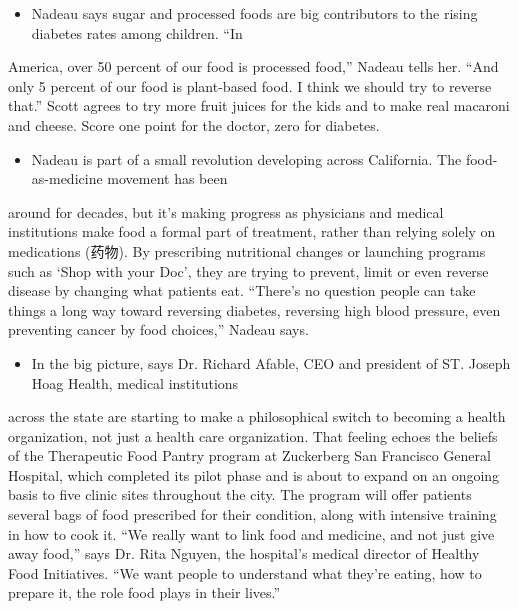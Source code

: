 \documentclass[UTF8,11pt]{ctexart}
\begin{document}
\begin{itemize}[leftmargin=2em,itemsep=.2em,topsep=.4em]\item[D.] Nadeau says sugar and processed foods are big contributors to the rising diabetes rates among children. “In
\end{itemize}

America, over 50 percent of our food is processed food,” Nadeau tells her. “And only 5 percent of our food is plant-based food. I think we should try to reverse that.” Scott agrees to try more fruit juices for the kids and to make real macaroni and cheese. Score one point for the doctor, zero for diabetes.


\begin{itemize}[leftmargin=2em,itemsep=.2em,topsep=.4em]\item[E.] Nadeau is part of a small revolution developing across California. The food-as-medicine movement has been
\end{itemize}

around for decades, but it’s making progress as physicians and medical institutions make food a formal part of treatment, rather than relying solely on medications (药物). By prescribing nutritional changes or launching programs such as ‘Shop with your Doc’, they are trying to prevent, limit or even reverse disease by changing what patients eat. “There’s no question people can take things a long way toward reversing diabetes, reversing high blood pressure, even preventing cancer by food choices,” Nadeau says.


\begin{itemize}[leftmargin=2em,itemsep=.2em,topsep=.4em]\item[F.] In the big picture, says Dr. Richard Afable, CEO and president of ST. Joseph Hoag Health, medical institutions
\end{itemize}

across the state are starting to make a philosophical switch to becoming a health organization, not just a health care organization. That feeling echoes the beliefs of the Therapeutic Food Pantry program at Zuckerberg San Francisco General Hospital, which completed its pilot phase and is about to expand on an ongoing basis to five clinic sites throughout the city. The program will offer patients several bags of food prescribed for their condition, along with intensive training in how to cook it. “We really want to link food and medicine, and not just give away food,” says Dr. Rita Nguyen, the hospital’s medical director of Healthy Food Initiatives. “We want people to understand what they’re eating, how to prepare it, the role food plays in their lives.”
\end{document}
